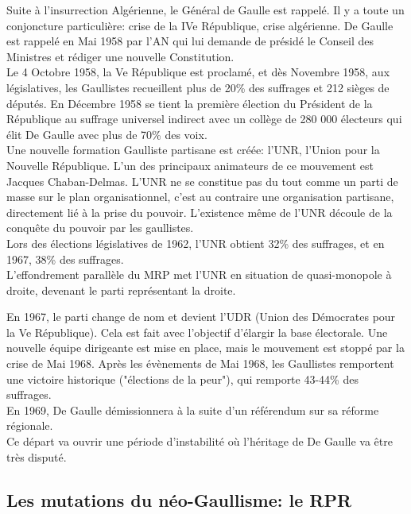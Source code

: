 \documentclass[10pt, a4paper, openany]{book}
\begin{document}
Suite à l'insurrection Algérienne, le Général de Gaulle est rappelé. Il y a toute un conjoncture particulière: crise de la IVe République, crise algérienne. De Gaulle est rappelé en Mai 1958 par l'AN qui lui demande de présidé le Conseil des Ministres et rédiger une nouvelle Constitution. \\
Le 4 Octobre 1958, la Ve République est proclamé, et dès Novembre 1958, aux législatives, les Gaullistes recueillent plus de 20\% des suffrages et 212 sièges de députés. En Décembre 1958 se tient la première élection du Président de la République au suffrage universel indirect avec un collège de 280 000 électeurs qui élit De Gaulle avec plus de 70\% des voix. \\
Une nouvelle formation Gaulliste partisane est créée: l'UNR, l'Union pour la Nouvelle République. L'un des principaux animateurs de ce mouvement est Jacques Chaban-Delmas. L'UNR ne se constitue pas du tout comme un parti de masse sur le plan organisationnel, c'est au contraire une organisation partisane, directement lié à la prise du pouvoir. L'existence même de l'UNR découle de la conquête du pouvoir par les gaullistes. \\
Lors des élections législatives de 1962, l'UNR obtient 32\% des suffrages, et en 1967, 38\% des suffrages. \\
L'effondrement parallèle du MRP met l'UNR en situation de quasi-monopole à droite, devenant le parti représentant la droite. 


En 1967, le parti change de nom et devient l'UDR (Union des Démocrates pour la Ve République). Cela est fait avec l'objectif d'élargir la base électorale. Une nouvelle équipe dirigeante est mise en place, mais le mouvement est stoppé par la crise de Mai 1968. Après les évènements de Mai 1968, les Gaullistes remportent une victoire historique ("élections de la peur"), qui remporte 43-44\% des suffrages. \\
En 1969, De Gaulle démissionnera à la suite d'un référendum sur sa réforme régionale. \\
Ce départ va ouvrir une période d'instabilité où l'héritage de De Gaulle va être très disputé. 

\subsection{Les mutations du néo-Gaullisme: le RPR}
\end{document}
